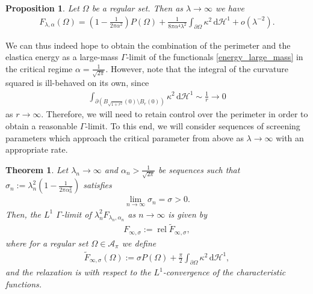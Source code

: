 \documentclass[11pt]{article}
\newcounter{statement}
\numberwithin{statement}{section}
\numberwithin{equation}{section}
\newtheorem{thm}[statement]{Theorem}
\newtheorem{prop}[statement]{Proposition}
\theoremstyle{remark}
\newcommand{\intd}{\, \mathrm{d}} 				%
\newcommand{\Hd}{\mathcal H}				%
\begin{document}
\begin{prop}\label{prop:expansion}
  Let $\Omega$ be a regular set.  Then as $\lambda \to \infty$ we
  have
  \begin{align*}
    F_{\lambda,\alpha}(\Omega) = \left( 1- \frac{1}{2\pi
    \alpha^2}\right) P(\Omega) + \frac{1}{8\pi 
    \alpha^4 \lambda^2}  \int_{\partial \Omega} \kappa^2 \intd
    \Hd^1 + o\left(\lambda^{-2} \right).
  \end{align*}
\end{prop}

We can thus indeed hope to obtain the combination of the perimeter
  and the elastica energy as a large-mass $\Gamma$-limit of the
functionals \eqref{energy_large_mass} in the critical regime
$\alpha = \frac{1}{\sqrt{2\pi}}$.  However, note that the integral of
the curvature squared is ill-behaved on its own, since
\begin{align}\label{eq:annuli_estimate}
  \int_{\partial \left(B_{\sqrt{1+r^2}}(0)\setminus B_{r}(0)\right) }
  \kappa^2 \intd \Hd^1 \sim \frac{1}{r} \to 0 
\end{align}
as $r\to \infty$.  Therefore, we will need to retain control over the
perimeter in order to obtain a reasonable $\Gamma$-limit.  To this
end, we will consider sequences of screening parameters which approach
the critical parameter from above as $\lambda \to \infty$ with an
appropriate rate.

\begin{thm}\label{thm:main}
  Let $\lambda_n \to \infty$ and $\alpha_n >\frac{1}{\sqrt{2\pi}}$ be
  sequences such that
  $\sigma_n := \lambda_n^2 \left( 1- \frac{1}{2\pi \alpha_n^2}
  \right)$ satisfies
	\begin{align}
		\lim_{n\to \infty} \sigma_n = \sigma >0.
	\end{align}
	Then, the $L^1$ $\Gamma$-limit of
        $\lambda_n^2 F_{\lambda_n, \alpha_n}$ as
        $n \to \infty$
        is given by
        \begin{align}
       	 	F_{\infty,\sigma} := \operatorname{rel} \tilde F_{\infty,\sigma},
        \end{align}
        where for a regular set $\Omega \in \mathcal{A}_\pi$ we define
         \begin{align}
           \label{elastica_smooth}
          \tilde F_{\infty,\sigma}(\Omega) := \sigma
          P(\Omega)+ \frac{\pi}{2} \int_{\partial \Omega}
          \kappa^2 \intd \Hd^1,
         \end{align}
         and the relaxation is with respect to the $L^1$-convergence
         of the characteristic functions.
\end{thm}
\end{document}
